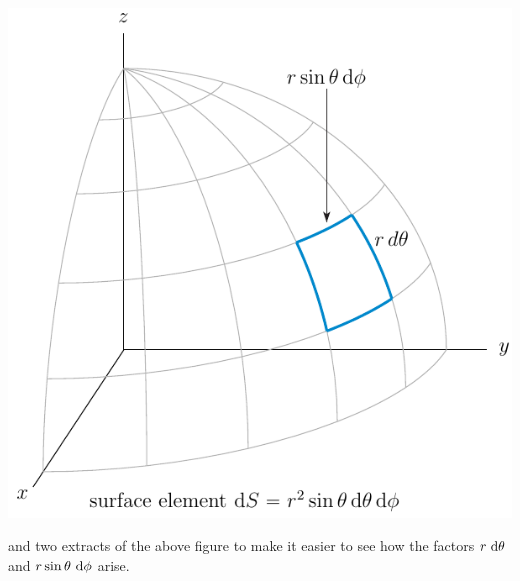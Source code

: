 \begin{efig}
\begin{center}
    \includegraphics{spher11.pdf}
\end{center}
\end{efig}
and two extracts of the above figure to make it easier to see 
how the factors $r\ \mathrm{d}\theta$ and 
$r\sin\theta\ \mathrm{d}\phi$ arise.
